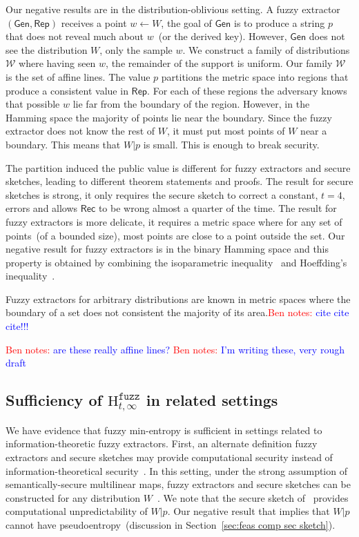 \documentclass[11pt]{article}
\newcommand{\secref}[1]{\mbox{Section~\ref{#1}}}
\newcommand{\class}[1]{{\ensuremath{\mathsf{#1}}}}
\newcommand{\gen}{\ensuremath{\class{Gen}}\xspace}
\newcommand{\rep}{\ensuremath{\class{Rep}}\xspace}
\newcommand{\rec}{\ensuremath{\class{Rec}}\xspace}
\newcommand{\Hfuzz}{\mathrm{H}^{\mathtt{fuzz}}_{t,\infty}}
\newcommand{\authnote}[2]{{\textcolor{red}{\textsf{#1 notes: }\textcolor{blue}{ #2}}\marginpar{\textcolor{red}{\textbf{!!!!!}}}}}
\newcommand{\authnote}[2]{}
\newcommand{\bnote}[1]{{\authnote{Ben}{#1}}}
\begin{document}
Our negative results are in the distribution-oblivious setting.  A fuzzy extractor $(\gen, \rep)$ receives a point $w\leftarrow W$, the goal of $\gen$ is to produce a string $p$ that does not reveal much about $w$~(or the derived key).  However, $\gen$ does not see the distribution $W$, only the sample $w$.  We construct a family of distributions $\mathcal{W}$ where having seen $w$, the remainder of the support is uniform.  Our family $\mathcal{W}$ is the set of affine lines.  The value $p$ partitions the metric space into regions that produce a consistent value in $\rep$.  For each of these regions the adversary knows that possible $w$ lie far from the boundary of the region.  However, in the Hamming space the majority of points lie near the boundary.  Since the fuzzy extractor does not know the rest of $W$, it must put most points of $W$ near a boundary.  This means that $W|p$ is small.  This is enough to break security.

 The partition induced the public value is different for fuzzy extractors and secure sketches, leading to different theorem statements and proofs.  
The result for secure sketches is strong, it only requires the secure sketch to correct a constant, $t=4$, errors and allows $\rec$ to be wrong almost a quarter of the time.  The result for fuzzy extractors is more delicate, it requires a metric space where for any set of points~(of a bounded size), most points are close to a point outside the set.  Our negative result for fuzzy extractors is in the binary Hamming space and this property is obtained by combining the isoparametric inequality~\cite{harper1966optimal} and Hoeffding's inequality~\cite{hoeffding1963probability}.  

Fuzzy extractors for arbitrary distributions are known in metric spaces where the boundary of a set does not consistent the majority of its area.\bnote{cite cite cite!!!}

\bnote{are these really affine lines?}
\bnote{I'm writing these, very rough draft}

\subsection{Sufficiency of $\Hfuzz$ in related settings}
\label{sec:related settings}
We have evidence that fuzzy min-entropy is sufficient in settings related to information-theoretic fuzzy extractors.  
First, an alternate definition fuzzy extractors and secure sketches may provide computational security instead of information-theoretical security~\cite{fuller2013computational}.  In this setting, under the strong assumption of semantically-secure multilinear maps, fuzzy extractors and secure sketches can be constructed for any distribution $W$~\cite{BitanskyCKP14}.  We note that the secure sketch of~\cite{BitanskyCKP14} provides computational unpredictability of $W |p$.  Our negative result that implies that $W|p$ cannot have pseudoentropy~(discussion in \secref{sec:feas comp sec sketch}).
\end{document}
